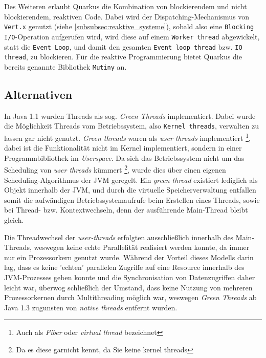 Des Weiteren erlaubt Quarkus die Kombination von blockierendem und nicht blockierendem, reaktiven Code.
Dabei wird der Dispatching-Mechanismus von \verb|Vert.x| genutzt (siehe \ref{subsubsec:reaktive_systeme}), sobald also eine
\verb|Blocking I/O|-Operation aufgerufen wird, wird diese auf einem \verb|Worker thread| abgewickelt, statt die \verb|Event Loop|, und damit den
gesamten \verb|Event loop thread| bzw. \verb|IO thread|, zu blockieren.
Für die reaktive Programmierung bietet Quarkus die bereits genannte Bibliothek \verb|Mutiny| an.\parencite{Quarkus}

\subsection{Alternativen}
\label{subsec:alternativen}
In Java 1.1 wurden Threads als sog. \textit{Green Threads} implementiert. Dabei wurde die Möglichkeit Threads vom Betriebssystem, also \verb|Kernel threads|,
verwalten zu lassen gar nicht genutzt.
\textit{Green threads} waren als \textit{user threads} implementiert \footnote{Auch als \textit{Fiber} oder \textit{virtual thread} bezeichnet},
dabei ist die Funktionalität
nicht im Kernel implementiert, sondern in einer Programmbibliothek im \textit{Userspace}.
Da sich das Betriebssystem nicht um das Scheduling von \textit{user threads} kümmert
\footnote{Da es diese garnicht kennt, da Sie keine kernel threads}, wurde dies über einen eigenen Scheduling-Algorithmus der JVM
geregelt.\parencite{Oracle2010}
Ein \textit{green thread} existiert lediglich als Objekt innerhalb der JVM, und durch die virtuelle Speicherverwaltung entfallen somit
die aufwändigen Betriebssystemaufrufe beim
Erstellen eines Threads, sowie bei Thread- bzw. Kontextwechseln, denn der ausführende Main-Thread bleibt gleich.

Die Threadwechsel der \textit{user-threads} erfolgten ausschließlich innerhalb des Main-Threads, weswegen keine echte Parallelität realisiert werden konnte,
da immer nur ein Prozessorkern genutzt wurde.
Während der Vorteil dieses Modells darin lag, dass es keine 'echten' parallelen Zugriffe auf eine Resource innerhalb des JVM-Prozesses geben konnte
und die Synchronisation von Datenzugriffen daher leicht war, überwog schließlich der Umstand, dass keine Nutzung von mehreren Prozessorkernen
durch Multithreading möglich war, weswegen \textit{Green Threads} ab Java 1.3 zugunsten von \textit{native threads} entfernt wurden.

